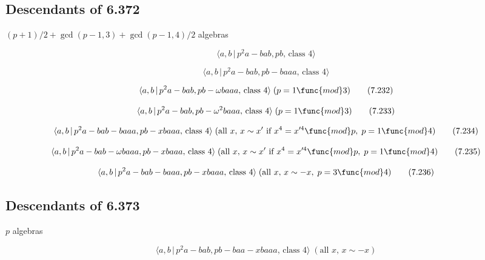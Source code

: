 \documentclass[10pt]{article}
\begin{document}
\subsection{Descendants of 6.372}

$(p+1)/2+\gcd (p-1,3)+\gcd (p-1,4)/2$ algebras

\begin{equation}
\langle a,b\,|\,p^2a-bab,pb,\,\text{class }4\rangle  \tag{7.230}
\end{equation}

\begin{equation}
\langle a,b\,|\,p^2a-bab,pb-baaa,\,\text{class }4\rangle  \tag{7.231}
\end{equation}

\begin{equation}
\langle a,b\,|\,p^{2}a-bab,pb-\omega baaa,\,\text{class }4\rangle \;(p=1%
\func{mod}3)  \tag{7.232}
\end{equation}

\begin{equation}
\langle a,b\,|\,p^{2}a-bab,pb-\omega ^{2}baaa,\,\text{class }4\rangle \;(p=1%
\func{mod}3)  \tag{7.233}
\end{equation}

\begin{equation}
\langle a,b\,|\,p^{2}a-bab-baaa,pb-xbaaa,\,\text{class }4\rangle \;(\text{%
all }x,\,x\sim x^{\prime }\text{ if }x^{4}=x^{\prime 4}\func{mod}p,\;p=1%
\func{mod}4)  \tag{7.234}
\end{equation}

\begin{equation}
\langle a,b\,|\,p^{2}a-bab-\omega baaa,pb-xbaaa,\,\text{class }4\rangle \;(%
\text{all }x,\,x\sim x^{\prime }\text{ if }x^{4}=x^{\prime 4}\func{mod}%
p,\;p=1\func{mod}4)  \tag{7.235}
\end{equation}

\begin{equation}
\langle a,b\,|\,p^{2}a-bab-baaa,pb-xbaaa,\,\text{class }4\rangle \;(\text{%
all }x,\,x\sim -x,\;p=3\func{mod}4)  \tag{7.236}
\end{equation}

\subsection{Descendants of 6.373}

$p$ algebras

\begin{equation}
\langle a,b\,|\,p^{2}a-bab,pb-baa-xbaaa,\,\text{class }4\rangle \;(\text{all 
}x,\,x\sim -x)  \tag{7.237}
\end{equation}
\end{document}
